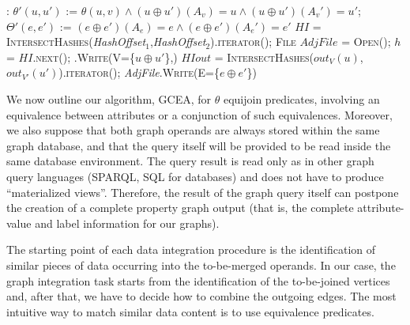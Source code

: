 \begin{algorithm}[!b]
{\begin{minipage}{\linewidth}
\begin{algorithmic}[1]
				:
				\State $\theta'(u,u')$ := $\theta(u,v)\wedge (u\oplus u')(A_v)=u\wedge (u\oplus u')(A_v')=u'$;
				\State $\Theta'(e,e')$ := $(e\oplus e')(A_e)=e \wedge (e\oplus e')(A_e')=e'$
				\State $HI$ = \textsc{IntersectHashes}(\textit{HashOffset}$_1$,\textit{HashOffset}$_2$).\textsc{iterator}();
				\State \textsc{File} $AdjFile$ = \textsc{Open}();
				\State $h$ = $HI$.\textsc{next}();
				.\textsc{Write}(V=\{$u\oplus u'$\},)
				\State $HIout$ = \textsc{IntersectHashes}($out_{V}(u)$,$out_{V'}(u')$).\textsc{iterator}();\label{code:vintersection}
				\State \textit{AdjFile}.\textsc{Write}(E=\{$e\oplus e'$\})
				\EndIf
				\EndFor
				\EndWhile
				\EndIf
				\EndFor
				\EndWhile

				\EndProcedure
			\end{algorithmic}
		\end{minipage}}
	\end{algorithm}
	We now outline our algorithm, GCEA, for $\theta$ equijoin predicates, involving an
equivalence between attributes or a conjunction of such equivalences. Moreover, we also suppose that both graph operands are always stored within the same graph database, and that the query itself will be provided to be read inside the same database environment.
The query result
is read only as in other graph query languages (SPARQL, SQL for databases) and does not have to
produce ``materialized views''. Therefore, the result of the graph query itself can postpone the creation of a complete property graph output (that is, the complete attribute-value and label information for our graphs).

		The starting point of each data integration procedure is the identification of
		similar pieces of data occurring into the to-be-merged operands. In our case, the
	graph { {integration}} task starts from the identification of the to-be-joined vertices
		and, after that, we have to decide how to combine the outgoing edges. The most
		intuitive way to match similar data content is to use equivalence predicates.
		
